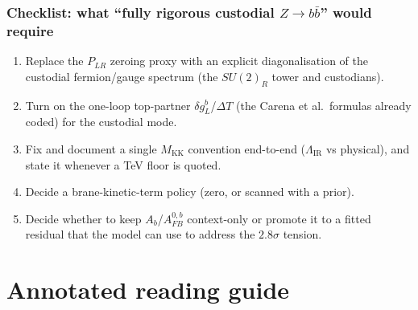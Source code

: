\documentclass[11pt]{article}
\newcommand{\MKK}{M_{\mathrm{KK}}}
\newcommand{\LIR}{\Lambda_{\mathrm{IR}}}
\newcommand{\SUR}{SU(2)_R}
\newcommand{\PLR}{P_{LR}}
\newcommand{\dgL}{\delta g_L^b}
\newcommand{\Afb}{A_{FB}^{0,b}}
\theoremstyle{definition}
\begin{document}
\section{Checklist: what ``fully rigorous custodial $Z\to b\bar b$'' would require}
\begin{enumerate}[leftmargin=1.8em]
\item Replace the $\PLR$ zeroing proxy with an explicit diagonalisation of the
custodial fermion/gauge spectrum (the $\SUR$ tower and custodians).
\item Turn on the one-loop top-partner $\dgL$/$\Delta T$ (the Carena et al.\
formulas already coded) for the custodial mode.
\item Fix and document a single $\MKK$ convention end-to-end ($\LIR$ vs
physical), and state it whenever a TeV floor is quoted.
\item Decide a brane-kinetic-term policy (zero, or scanned with a prior).
\item Decide whether to keep $A_b$/$\Afb$ context-only or promote it to a fitted
residual that the model can use to address the $2.8\sigma$ tension.
\end{enumerate}

\part*{Annotated reading guide}
\end{document}
